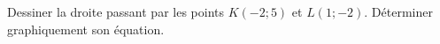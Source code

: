 
\begin{exercice}\label{exosmath-0615}

    Dessiner la droite passant par les points \( K(-2;5)\) et \( L(1;-2)\). Déterminer graphiquement son équation.

\end{exercice}
